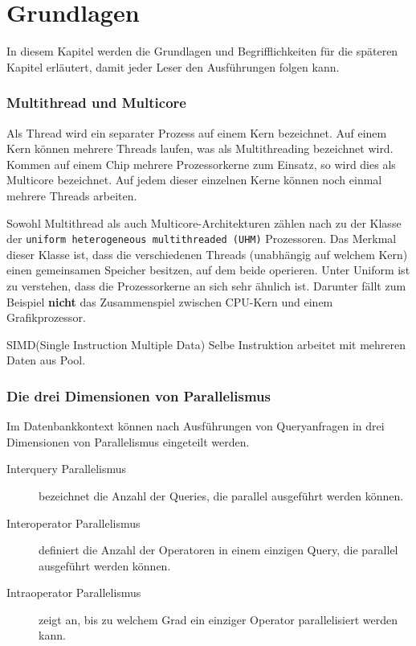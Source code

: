 \chapter{Grundlagen}
\label{sec:Grundlagen}

In diesem Kapitel werden die Grundlagen und Begrifflichkeiten für die späteren Kapitel erläutert, damit jeder Leser den Ausführungen folgen kann.

\subsection*{Multithread und Multicore}
Als Thread wird ein separater Prozess auf einem Kern bezeichnet. Auf einem Kern können mehrere Threads laufen, was als Multithreading bezeichnet wird. Kommen auf einem Chip mehrere Prozessorkerne zum Einsatz, so wird dies als Multicore bezeichnet. Auf jedem dieser einzelnen Kerne können noch einmal mehrere Threads arbeiten.

Sowohl Multithread als auch Multicore-Architekturen zählen nach \cite{GARCIA} zu der Klasse der \texttt{uniform heterogeneous multithreaded (UHM)} Prozessoren. Das Merkmal dieser Klasse ist, dass die verschiedenen Threads (unabhängig auf welchem Kern) einen gemeinsamen Speicher besitzen, auf dem beide operieren. Unter Uniform ist zu verstehen, dass die Prozessorkerne an sich sehr ähnlich ist. Darunter fällt zum Beispiel \textbf{nicht} das Zusammenspiel zwischen CPU-Kern und einem Grafikprozessor.

SIMD(Single Instruction Multiple Data) Selbe Instruktion arbeitet mit mehreren Daten aus Pool.

\subsection*{Die drei Dimensionen von Parallelismus}
Im Datenbankkontext können nach \cite{HUBER} Ausführungen von Queryanfragen in drei Dimensionen von Parallelismus eingeteilt werden.

\begin{description}
\item[Interquery Parallelismus] bezeichnet die Anzahl der Queries, die parallel ausgeführt werden können.
\item[Interoperator Parallelismus] definiert die Anzahl der Operatoren in einem einzigen Query, die parallel ausgeführt werden können.
\item[Intraoperator Parallelismus] zeigt an, bis zu welchem Grad ein einziger Operator parallelisiert werden kann.
\end{description}

